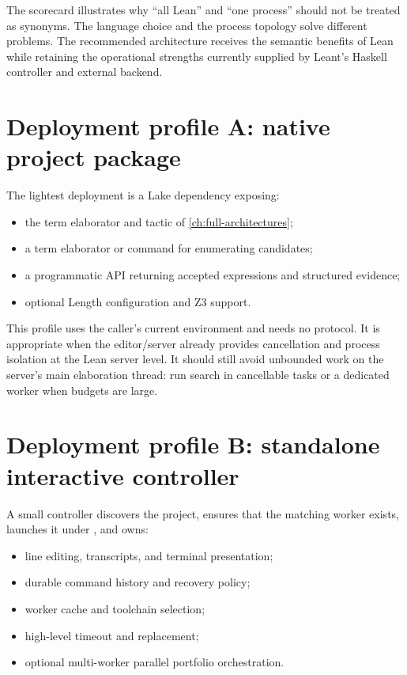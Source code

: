 \documentclass[10pt,letterpaper,oneside]{report}
\newcommand{\code}[1]{\texttt{\detokenize{#1}}}
\begin{document}
The scorecard illustrates why ``all Lean'' and ``one process'' should not be treated as synonyms. The language choice and the process topology solve different problems. The recommended architecture receives the semantic benefits of Lean while retaining the operational strengths currently supplied by Leant's Haskell controller and external backend.

\section{Deployment profile A: native project package}

The lightest deployment is a Lake dependency exposing:

\begin{itemize}
  \item the \code{leant} term elaborator and \code{leant?} tactic of \autoref{ch:full-architectures};
  \item a term elaborator or command for enumerating candidates;
  \item a programmatic \code{MetaM} API returning accepted expressions and structured evidence;
  \item optional Length configuration and Z3 support.
\end{itemize}

This profile uses the caller's current environment and needs no protocol. It is appropriate when the editor/server already provides cancellation and process isolation at the Lean server level. It should still avoid unbounded work on the server's main elaboration thread: run search in cancellable tasks or a dedicated worker when budgets are large.

\section{Deployment profile B: standalone interactive controller}

A small controller discovers the project, ensures that the matching worker exists, launches it under \code{lake env}, and owns:

\begin{itemize}
  \item line editing, transcripts, and terminal presentation;
  \item durable command history and recovery policy;
  \item worker cache and toolchain selection;
  \item high-level timeout and replacement;
  \item optional multi-worker parallel portfolio orchestration.
\end{itemize}
\end{document}
